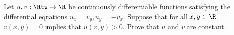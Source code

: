 Let $u,v:\Rtw\rightarrow \R$ be continuously differentiable functions
satisfying the differential equations $u_x=v_y, u_y=-v_x$. Suppose
that for all $x,y\in \R$, $v(x,y)=0$ implies that $u(x,y)>0$. Prove
that $u$ and $v$ are constant.
